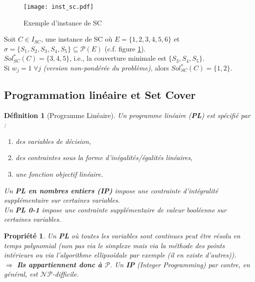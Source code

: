 \documentclass[12pt]{article}
\newcommand{\titre}[1]{\textcolor{title}{#1}}
\newtheorem{de}{D\'efinition}[section]
\newtheorem{propriete}{Propri\'et\'e}[section]
\begin{document}
\begin{figure}[H]
    \begin{center}
    \texttt{[image: inst\_sc.pdf]}
    \caption{Exemple d'instance de \titre{SC}}
		\label{scex}
    \end{center}
\end{figure}

Soit $C \in I_{SC}$, une instance de SC où $E = \{1, 2, 3, 4, 5, 6\}$ et $\sigma = \{S_1, S_2, S_3, S_4, S_5\} \subseteq \mathcal{P}(E)$ (c.f. figure \ref{scex}).\\
$Sol^*_{SC}(C) = \{3,4,5\}$, i.e., la couverture minimale est $\{S_3, S_4, S_5 \}$.\\
Si $w_j = 1 \; \forall j$ \textit{(version non-pondérée du problème)},
alors $Sol^*_{SC}(C) = \{1,2\}$.

\subsection{Programmation linéaire et Set Cover}

\begin{de}[Programme Linéaire]
Un programme linéaire (\titre{\textbf{PL}}) est spécifié par :
\begin{enumerate}
\item des variables de décision,
\item des contraintes sous la forme d'inégalités/égalités linéaires,
\item une fonction objectif linéaire.
\end{enumerate}
Un \textbf{\titre{PL} en nombres entiers (\titre{IP})} impose une contrainte
d'intégralité supplémentaire sur certaines variables.\\
Un \textbf{\titre{PL} 0-1} impose une contrainte supplémentaire de valeur
booléenne sur certaines variables.\\
\end{de}

\begin{propriete}
Un \textbf{\titre{PL}} où toutes les variables sont continues peut être résolu
en temps polynomial (non pas via le simplexe mais via la méthode des points
intérieurs ou via l'algorithme ellipsoïdale par exemple (il en existe
d'autres)).\\
\indent $\Rightarrow$ \textbf{Ils appartiennent donc à $\mathcal{P}$}. Un
\textbf{\titre{IP}} \textit{(Integer Programming)} par contre,
en général, est $\mathcal{NP}$-\textit{difficile}.
\end{propriete}
\end{document}
